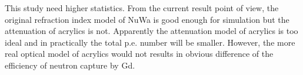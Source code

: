 

This study need higher statistics. From the current result point of view,
the original refraction index model of NuWa is good enough for simulation but the attenuation of acrylics is not.
Apparently the attenuation model of acrylics is too ideal and in practically the total p.e. number will be smaller.
However, the more real optical model of acrylics would not results in obvious difference of the efficiency of neutron capture by Gd.


